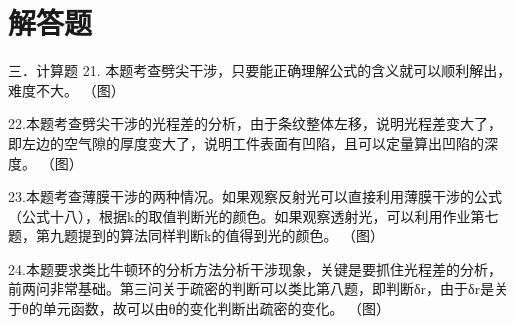\section{解答题}

三．计算题
21. 本题考查劈尖干涉，只要能正确理解公式的含义就可以顺利解出，难度不大。
（图）

22.本题考查劈尖干涉的光程差的分析，由于条纹整体左移，说明光程差变大了，即左边的空气隙的厚度变大了，说明工件表面有凹陷，且可以定量算出凹陷的深度。
（图）

23.本题考查薄膜干涉的两种情况。如果观察反射光可以直接利用薄膜干涉的公式（公式十八），根据k的取值判断光的颜色。如果观察透射光，可以利用作业第七题，第九题提到的算法同样判断k的值得到光的颜色。
（图）

24.本题要求类比牛顿环的分析方法分析干涉现象，关键是要抓住光程差的分析，前两问非常基础。第三问关于疏密的判断可以类比第八题，即判断δr，由于δr是关于θ的单元函数，故可以由θ的变化判断出疏密的变化。
（图）

